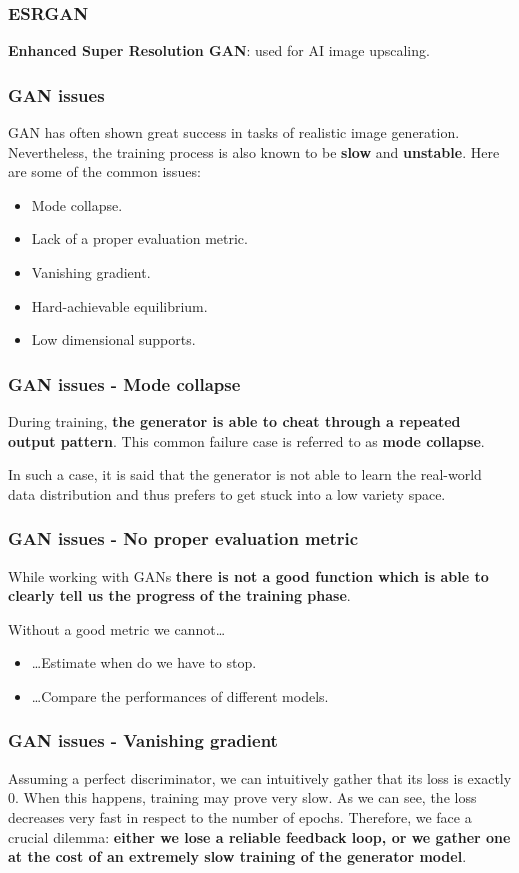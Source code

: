 \begin{frame}
    \frametitle{ESRGAN}
    \textbf{Enhanced Super Resolution GAN}: used for AI image upscaling.
\end{frame}

\begin{frame}
    \frametitle{GAN issues}
    GAN has often shown great success in tasks of realistic image generation. Nevertheless, the training process is also known to be \textbf{slow} and \textbf{unstable}. Here are some of the common issues:
    \begin{itemize}
        \item Mode collapse.
        \item Lack of a proper evaluation metric.
        \item Vanishing gradient.
        \item Hard-achievable equilibrium.
        \item Low dimensional supports.
    \end{itemize}
\end{frame}

\begin{frame}
    \frametitle{GAN issues - Mode collapse}
    During training, \textbf{the generator is able to cheat through a repeated output pattern}. This common failure case is referred to as \textbf{mode collapse}.

    In such a case, it is said that the generator is not able to learn the real-world data distribution and thus prefers to get stuck into a low variety space.

\end{frame}

\begin{frame}
    \frametitle{GAN issues - No proper evaluation metric}
    While working with GANs \textbf{there is not a good function which is able to clearly tell us the progress of the training phase}.

    Without a good metric we cannot\dots
    \begin{itemize}
        \item \dots Estimate when do we have to stop.
        \item \dots Compare the performances of different models.
    \end{itemize}
\end{frame}

\begin{frame}
    \frametitle{GAN issues - Vanishing gradient}
    Assuming a perfect discriminator, we can intuitively gather that its loss is exactly $0$. When this happens, training may prove very slow.
    As we can see, the loss decreases very fast in respect to the number of epochs. Therefore, we face a crucial dilemma: \textbf{either we lose a reliable feedback loop, or we gather one at the cost of an extremely slow training of the generator model}.
\end{frame}

